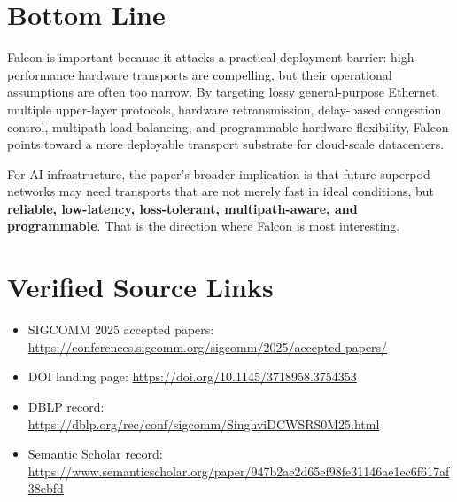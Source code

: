 \documentclass[11pt]{article}
\begin{document}
\section{Bottom Line}

Falcon is important because it attacks a practical deployment barrier: high-performance hardware transports are compelling, but their operational assumptions are often too narrow. By targeting lossy general-purpose Ethernet, multiple upper-layer protocols, hardware retransmission, delay-based congestion control, multipath load balancing, and programmable hardware flexibility, Falcon points toward a more deployable transport substrate for cloud-scale datacenters.

For AI infrastructure, the paper's broader implication is that future superpod networks may need transports that are not merely fast in ideal conditions, but \textbf{reliable, low-latency, loss-tolerant, multipath-aware, and programmable}. That is the direction where Falcon is most interesting.

\section{Verified Source Links}

\begin{itemize}
  \item SIGCOMM 2025 accepted papers: \href{https://conferences.sigcomm.org/sigcomm/2025/accepted-papers/}{https://conferences.sigcomm.org/sigcomm/2025/accepted-papers/}
  \item DOI landing page: \href{https://doi.org/10.1145/3718958.3754353}{https://doi.org/10.1145/3718958.3754353}
  \item DBLP record: \href{https://dblp.org/rec/conf/sigcomm/SinghviDCWSRS0M25.html}{https://dblp.org/rec/conf/sigcomm/SinghviDCWSRS0M25.html}
  \item Semantic Scholar record: \href{https://www.semanticscholar.org/paper/947b2ae2d65ef98fe31146ae1ec6f617af38ebfd}{https://www.semanticscholar.org/paper/947b2ae2d65ef98fe31146ae1ec6f617af38ebfd}
\end{itemize}
\end{document}
